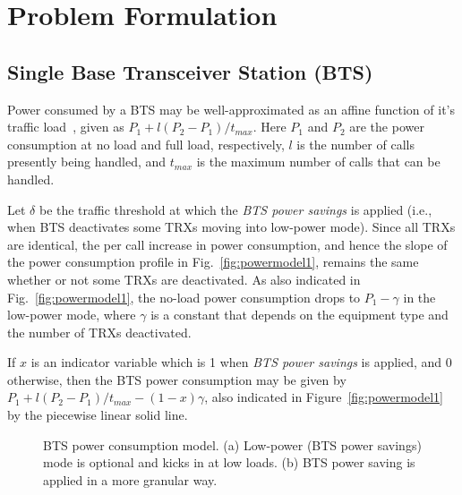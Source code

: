 \section{Problem Formulation}
\label{sec:formulation}
\subsection{Single Base Transceiver Station (BTS)}
Power consumed by a BTS may be well-approximated as an affine function of it's traffic load~\cite{Peng:2011:BTSSaving:Mobicom}, given as
$P_1+l(P_2-P_1)/t_{max}$. Here $P_1$ and $P_2$ are the power
consumption at no load and full load, respectively, $l$ is the
number of calls presently being handled, and $t_{max}$ is the
maximum number of calls that can be handled.

Let $\delta$ be the traffic threshold at which the \textit{BTS
power savings} is applied (i.e., when BTS deactivates some TRXs
moving into low-power mode). Since all TRXs are identical, the
per call increase in power consumption, and hence the slope of
the power consumption profile in Fig.~\ref{fig:powermodel1},
remains the same whether or not some TRXs are deactivated. As
also indicated in Fig.~\ref{fig:powermodel1}, the no-load power
consumption drops to $P_1-\gamma$ in the low-power mode, where
$\gamma$ is a constant that depends on the equipment type and
the number of TRXs deactivated.

If $x$ is an indicator variable which is 1 when \textit{BTS
power savings} is applied, and $0$ otherwise, then the BTS
power consumption may be given by $P_1+l(P_2-P_1)/t_{max} -
(1-x)\gamma$, also indicated in Figure~\ref{fig:powermodel1} by
the piecewise linear solid line.

\begin{figure}
\centering
{}
\caption{BTS power consumption model. (a) Low-power (BTS power savings) mode is optional and kicks in at low loads. (b) BTS power saving is applied in a more granular way.} 
\label{fig:trafficmodelstats}
\end{figure}

